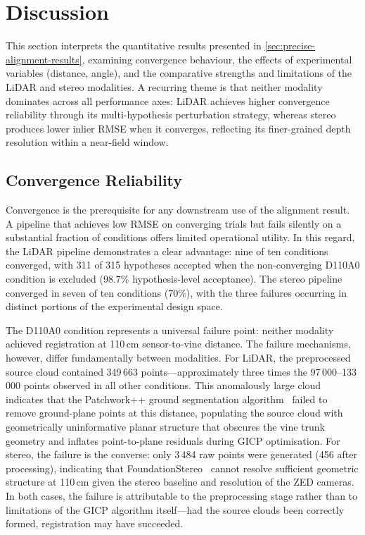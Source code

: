 \section{Discussion}
\label{sec:precise-alignment-discussion}

This section interprets the quantitative results presented in \cref{sec:precise-alignment-results}, examining convergence behaviour, the effects of experimental variables (distance, angle), and the comparative strengths and limitations of the LiDAR and stereo modalities. A recurring theme is that neither modality dominates across all performance axes: LiDAR achieves higher convergence reliability through its multi-hypothesis perturbation strategy, whereas stereo produces lower inlier RMSE when it converges, reflecting its finer-grained depth resolution within a near-field window.

\subsection{Convergence Reliability}
\label{subsec:pa-discussion-convergence}

Convergence is the prerequisite for any downstream use of the alignment result. A pipeline that achieves low RMSE on converging trials but fails silently on a substantial fraction of conditions offers limited operational utility. In this regard, the LiDAR pipeline demonstrates a clear advantage: nine of ten conditions converged, with 311 of 315 hypotheses accepted when the non-converging D110A0 condition is excluded (98.7\% hypothesis-level acceptance). The stereo pipeline converged in seven of ten conditions (70\%), with the three failures occurring in distinct portions of the experimental design space.

The D110A0 condition represents a universal failure point: neither modality achieved registration at 110\,cm sensor-to-vine distance. The failure mechanisms, however, differ fundamentally between modalities. For LiDAR, the preprocessed source cloud contained 349\,663 points---approximately three times the 97\,000--133\,000 points observed in all other conditions. This anomalously large cloud indicates that the Patchwork++ ground segmentation algorithm~\cite{leePatchworkFastRobust2022} failed to remove ground-plane points at this distance, populating the source cloud with geometrically uninformative planar structure that obscures the vine trunk geometry and inflates point-to-plane residuals during GICP optimisation. For stereo, the failure is the converse: only 3\,484 raw points were generated (456 after processing), indicating that FoundationStereo~\cite{wenFoundationStereoZeroShot2025} cannot resolve sufficient geometric structure at 110\,cm given the stereo baseline and resolution of the ZED cameras. In both cases, the failure is attributable to the preprocessing stage rather than to limitations of the GICP algorithm itself---had the source clouds been correctly formed, registration may have succeeded.


